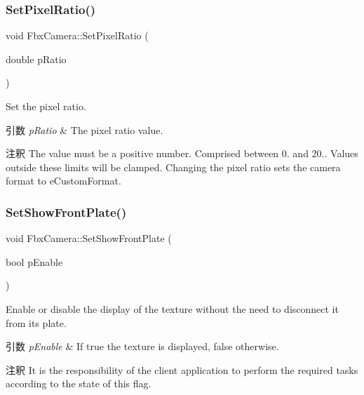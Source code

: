 \subsubsection{\texorpdfstring{Set\+Pixel\+Ratio()}{SetPixelRatio()}}
{\footnotesize\ttfamily void Fbx\+Camera\+::\+Set\+Pixel\+Ratio (\begin{DoxyParamCaption}\item[{double}]{p\+Ratio }\end{DoxyParamCaption})}

Set the pixel ratio. 
\begin{DoxyParams}{引数}
{\em p\+Ratio} & The pixel ratio value. \\
\hline
\end{DoxyParams}
\begin{DoxyRemark}{注釈}
The value must be a positive number. Comprised between 0. and 20.. Values outside these limits will be clamped. Changing the pixel ratio sets the camera format to e\+Custom\+Format. 
\end{DoxyRemark}
\mbox{\label{class_fbx_camera_a68f728e9e8fea2ab93f2b050841b4d75}} 
\subsubsection{\texorpdfstring{Set\+Show\+Front\+Plate()}{SetShowFrontPlate()}}
{\footnotesize\ttfamily void Fbx\+Camera\+::\+Set\+Show\+Front\+Plate (\begin{DoxyParamCaption}\item[{bool}]{p\+Enable }\end{DoxyParamCaption})}

Enable or disable the display of the texture without the need to disconnect it from its plate. 
\begin{DoxyParams}{引数}
{\em p\+Enable} & If {\ttfamily true} the texture is displayed, {\ttfamily false} otherwise. \\
\hline
\end{DoxyParams}
\begin{DoxyRemark}{注釈}
It is the responsibility of the client application to perform the required tasks according to the state of this flag. 
\end{DoxyRemark}
\mbox{\label{class_fbx_camera_a4ef18832cc863f5dcc086d0d10686122}} 
